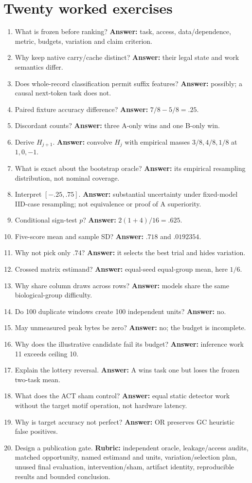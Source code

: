 \section{Twenty worked exercises}
\begin{enumerate}
\item What is frozen before ranking? \textbf{Answer:} task, access, data/dependence, metric, budgets, variation and claim criterion.
\item Why keep native carry/cache distinct? \textbf{Answer:} their legal state and work semantics differ.
\item Does whole-record classification permit suffix features? \textbf{Answer:} possibly; a causal next-token task does not.
\item Paired fixture accuracy difference? \textbf{Answer:} $7/8-5/8=.25$.
\item Discordant counts? \textbf{Answer:} three A-only wins and one B-only win.
\item Derive $H_{j+1}$. \textbf{Answer:} convolve $H_j$ with empirical masses $3/8,4/8,1/8$ at $1,0,-1$.
\item What is exact about the bootstrap oracle? \textbf{Answer:} its empirical resampling distribution, not nominal coverage.
\item Interpret $[-.25,.75]$. \textbf{Answer:} substantial uncertainty under fixed-model IID-case resampling; not equivalence or proof of A superiority.
\item Conditional sign-test $p$? \textbf{Answer:} $2(1+4)/16=.625$.
\item Five-score mean and sample SD? \textbf{Answer:} $.718$ and $.0192354$.
\item Why not pick only $.74$? \textbf{Answer:} it selects the best trial and hides variation.
\item Crossed matrix estimand? \textbf{Answer:} equal-seed equal-group mean, here $1/6$.
\item Why share column draws across rows? \textbf{Answer:} models share the same biological-group difficulty.
\item Do 100 duplicate windows create 100 independent units? \textbf{Answer:} no.
\item May unmeasured peak bytes be zero? \textbf{Answer:} no; the budget is incomplete.
\item Why does the illustrative candidate fail its budget? \textbf{Answer:} inference work 11 exceeds ceiling 10.
\item Explain the lottery reversal. \textbf{Answer:} A wins task one but loses the frozen two-task mean.
\item What does the ACT sham control? \textbf{Answer:} equal static detector work without the target motif operation, not hardware latency.
\item Why is target accuracy not perfect? \textbf{Answer:} OR preserves GC heuristic false positives.
\item Design a publication gate. \textbf{Rubric:} independent oracle, leakage/access audits,
matched opportunity, named estimand and units, variation/selection plan, unused final
evaluation, intervention/sham, artifact identity, reproducible results and bounded conclusion.
\end{enumerate}

